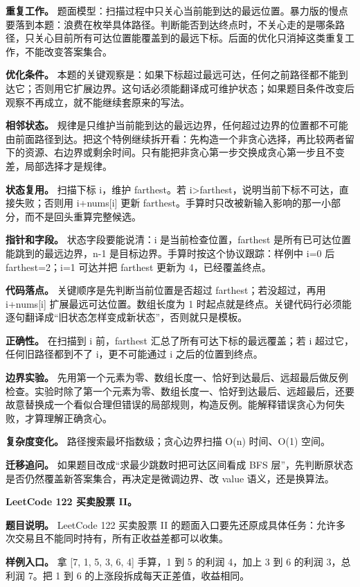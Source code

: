 \textbf{重复工作。} 题面模型：扫描过程中只关心当前能到达的最远位置。暴力版的慢点要落到本题：浪费在枚举具体路径。判断能否到达终点时，不关心走的是哪条路径，只关心目前所有可达位置能覆盖到的最远下标。后面的优化只消掉这类重复工作，不能改变答案集合。

\textbf{优化条件。} 本题的关键观察是：如果下标超过最远可达，任何之前路径都不能到达它；否则用它扩展边界。这句话必须能翻译成可维护状态；如果题目条件改变后观察不再成立，就不能继续套原来的写法。

\textbf{相邻状态。} 规律是只维护当前能到达的最远边界，任何超过边界的位置都不可能由前面路径到达。把这个特例继续拆开看：先构造一个非贪心选择，再比较两者留下的资源、右边界或剩余时间。只有能把非贪心第一步交换成贪心第一步且不变差，局部选择才是规律。

\textbf{状态复用。} 扫描下标 i，维护 farthest。若 i>farthest，说明当前下标不可达，直接失败；否则用 i+nums[i] 更新 farthest。手算时只改被新输入影响的那一小部分，而不是回头重算完整候选。

\textbf{指针和字段。} 状态字段要能说清：i 是当前检查位置，farthest 是所有已可达位置能跳到的最远边界，n-1 是目标边界。手算时按这个协议跟踪：样例中 i=0 后 farthest=2；i=1 可达并把 farthest 更新为 4，已经覆盖终点。

\textbf{代码落点。} 关键顺序是先判断当前位置是否超过 farthest；若没超过，再用 i+nums[i] 扩展最远可达位置。数组长度为 1 时起点就是终点。关键代码行必须能逐句翻译成“旧状态怎样变成新状态”，否则就只是模板。

\textbf{正确性。} 在扫描到 i 前，farthest 汇总了所有可达下标的最远覆盖；若 i 超过它，任何旧路径都到不了 i，更不可能通过 i 之后的位置到终点。

\textbf{边界实验。} 先用第一个元素为零、数组长度一、恰好到达最后、远超最后做反例检查。实验时除了第一个元素为零、数组长度一、恰好到达最后、远超最后，还要故意替换成一个看似合理但错误的局部规则，构造反例。能解释错误贪心为何失败，才算理解正确贪心。

\textbf{复杂度变化。} 路径搜索最坏指数级；贪心边界扫描 O(n) 时间、O(1) 空间。

\textbf{迁移追问。} 如果题目改成“求最少跳数时把可达区间看成 BFS 层”，先判断原状态是否仍然覆盖新答案集合，再决定是微调边界、改 value 语义，还是换算法。

\noindent\textbf{LeetCode 122 买卖股票 II。}

\textbf{题目说明。} LeetCode 122 买卖股票 II 的题面入口要先还原成具体任务：允许多次交易且不能同时持有，所有正收益差都可以收集。

\textbf{样例入口。} 拿 [7, 1, 5, 3, 6, 4] 手算，1 到 5 的利润 4，加上 3 到 6 的利润 3，总利润 7。把 1 到 6 的上涨段拆成每天正差值，收益相同。

